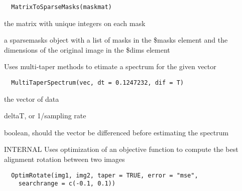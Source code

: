 \documentclass[a4paper]{book}
\begin{document}
%
\begin{Usage}
\begin{verbatim}
  MatrixToSparseMasks(maskmat)
\end{verbatim}
\end{Usage}
%
\begin{Arguments}
\begin{ldescription}
\item[\code{maskmat}] the matrix with unique integers on each
mask

\item[\code{return}] a sparsemasks object with a list of masks
in the \$masks element and the dimensions of the original
image in the \$dims element
\end{ldescription}
\end{Arguments}
%
\begin{Description}\relax
Uses multi-taper methods to etimate a spectrum for the
given vector
\end{Description}
%
\begin{Usage}
\begin{verbatim}
  MultiTaperSpectrum(vec, dt = 0.1247232, dif = T)
\end{verbatim}
\end{Usage}
%
\begin{Arguments}
\begin{ldescription}
\item[\code{vec}] the vector of data

\item[\code{dt}] deltaT, or 1/sampling rate

\item[\code{dif}] boolean, should the vector be differenced
before estimating the spectrum
\end{ldescription}
\end{Arguments}
%
\begin{Description}\relax
INTERNAL Uses optimization of an objective function to
compute the best alignment rotation between two images
\end{Description}
%
\begin{Usage}
\begin{verbatim}
  OptimRotate(img1, img2, taper = TRUE, error = "mse",
    searchrange = c(-0.1, 0.1))
\end{verbatim}
\end{Usage}
\end{document}
